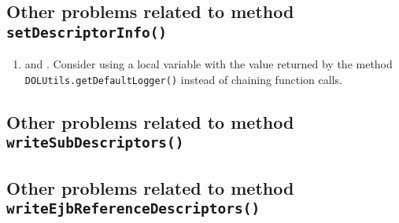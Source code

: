 \subsection{Other problems related to method \texttt{setDescriptorInfo()}}
\begin{enumerate}
	\item {} and . Consider using a local variable with the value returned by the method \texttt{DOLUtils.getDefaultLogger()} instead of chaining function calls.
\end{enumerate}

\subsection{Other problems related to method \texttt{writeSubDescriptors()}}

\subsection{Other problems related to method \texttt{writeEjbReferenceDescriptors()}}